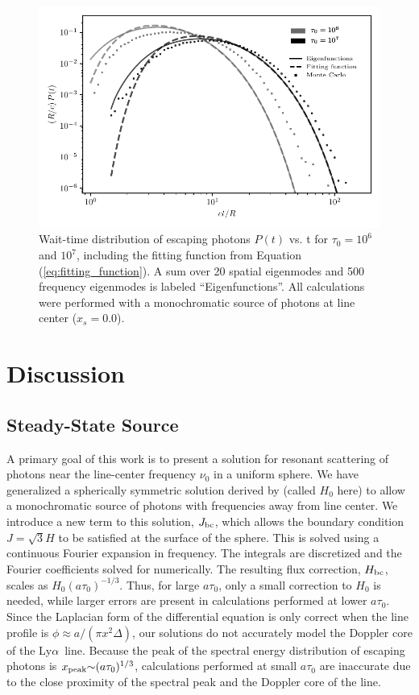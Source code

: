 \documentclass[linenumbers]{aastex63}
\newcommand\lya{Ly$\alpha$\ }
\begin{document}
\begin{figure}
    \centering
    \includegraphics{waittime.pdf}
    \caption{Wait-time distribution of escaping photons $P(t)$ vs. t  for $\tau_0=10^6$ and $10^7$, including the fitting function from Equation (\ref{eq:fitting_function}). A sum over 20 spatial eigenmodes and 500 frequency eigenmodes is labeled ``Eigenfunctions''. All calculations were performed with a monochromatic source of photons at line center ($x_s = 0.0$).}
    \label{fig:escape_time}
\end{figure}

\section{Discussion}

\subsection{Steady-State Source}
A primary goal of this work is to present a solution for resonant scattering of photons near the line-center frequency $\nu_0$ in a uniform sphere. We have generalized a spherically symmetric solution derived by \citet{2006ApJ...649...14D} (called $H_0$ here) to allow a monochromatic source of photons with frequencies away from line center. We introduce a new term to this solution, $J_{\rm bc}$, which allows the boundary condition $J=\sqrt{3}H$ to be satisfied at the surface of the sphere. This is solved using a continuous Fourier expansion in frequency. The integrals are discretized and the Fourier coefficients solved for numerically. The resulting flux correction, $H_{\rm bc}$, scales as $H_0(a\tau_0)^{-1/3}$. Thus, for large $a\tau_0$, only a small correction to $H_0$ is needed, while larger errors are present in calculations performed at lower $a\tau_0$. Since the Laplacian form of the differential equation is only correct when the line profile is $\phi \approx a/(\pi x^2 \Delta)$, our solutions do not accurately model the Doppler core of the \lya line. Because the peak of the spectral energy distribution of escaping photons is $x_{\rm peak} {\sim} (a\tau_0)^{1/3}$, calculations performed at small $a\tau_0$ are inaccurate due to the close proximity of the spectral peak and the Doppler core of the line.
\end{document}
